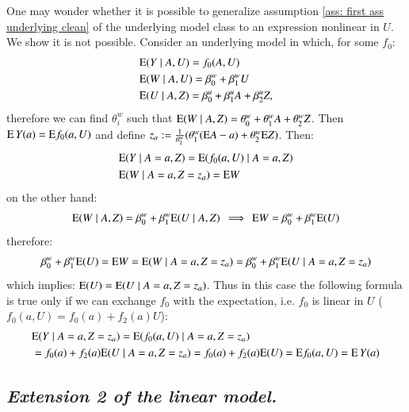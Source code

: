 \begin{remark}\label{remark: no nonlinear U}
    One may wonder whether it is possible to generalize assumption \ref{ass: first ass underlying clean} of the underlying model class to an expression nonlinear in $U$. We show it is not possible. Consider an underlying model in which, for some $f_0$:
\begin{align*}
    &\mathrm{E}(Y \mid A, U) = f_0(A,U) \\
    &\mathrm{E}(W \mid A, U) = \beta^{w}_0 + \beta_1^{w} U \\
    & \mathrm{E}(U \mid A,Z) = \beta_0^u + \beta_1^u A + \beta_2^u Z,
\end{align*}
therefore we can find $\theta_i^w$ such that $\mathrm{E}(W \mid A,Z) = \theta_{0}^{w} + \theta_{1}^{w} A + \theta_{2}^{w} Z$. Then $\mathrm{E} \, Y(a) = \mathrm{E} f_0(a,U)$ and define $z_a := \frac{1}{\theta_2^{w}} ( \theta_1^{w} (\mathrm{E} A - a) + \theta_2^{w} \mathrm{E} Z)$. Then:
\begin{align*}
    &\mathrm{E}(Y \mid A=a, Z) = \mathrm{E} ( f_0(a,U) \mid A=a,Z) \\
    &\mathrm{E}(W \mid A=a, Z= z_a) = \mathrm{E} W
\end{align*}
on the other hand:
\begin{align*}
    \mathrm{E}(W \mid A,Z) = \beta^{w}_0 + \beta_1^{w} \mathrm{E}( U \mid A,Z) \, \implies \, \mathrm{E} W = \beta^{w}_0 + \beta_1^{w} \mathrm{E}( U )
\end{align*}
therefore:
\begin{align*}
    \beta^{w}_0 + \beta_1^{w} \mathrm{E}( U ) = \mathrm{E} W = \mathrm{E} (W \mid A=a, Z= z_a) = \beta^{w}_0 + \beta_1^{w} \mathrm{E}( U \mid A=a, Z= z_a ) 
\end{align*}
which implies: $\mathrm{E}(U) = \mathrm{E}(U \mid A=a, Z= z_a)$. Thus in this case the following formula is true only if we can exchange $f_0$ with the expectation, i.e. $f_0$ is linear in $U$ ($f_0(a,U) = f_0(a) + f_2(a) U$):
\begin{align*}
    & \mathrm{E}( Y \mid A=a, Z= z_a) = \mathrm{E}( f_0(a,U) \mid A=a, Z= z_a)  \\
    &=  f_0(a) + f_2(a) \mathrm{E}( U \mid A=a, Z= z_a ) =  f_0(a) + f_2(a) \mathrm{E}(U) = \mathrm{E} f_0(a,U) = \mathrm{E} \, Y(a) 
\end{align*}
\end{remark}



\subsection*{\textit{Extension 2 of the linear model.}}

